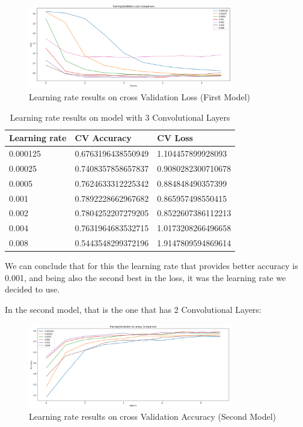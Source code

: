 \documentclass[conference]{IEEEtran}
\begin{document}
\begin{figure}[H]
    \centering
    \includegraphics[width=3.5in]{pictures/model1_learning_rate_loss.png}
    \caption{Learning rate results on cross Validation Loss (First Model)}\label{fig:example4}
\end{figure}

\begin{table}[H]
\centering
\caption{Learning rate results on model with 3 Convolutional Layers}
\begin{tabular}{ | m{3.5em} | m{3.2cm}| m{3.2cm} | }
\hline
Learning rate & CV Accuracy & CV Loss \\ 
\hline
0.000125 & 0.6763196438550949 & 1.104457899928093 \\
\hline
0.00025 & 0.7408357858657837 & 0.9080282300710678 \\
\hline
0.0005 & 0.7624633312225342 & 0.884848490357399 \\
\hline
0.001 & 0.7892228662967682 & 0.865957498550415 \\
\hline
0.002 & 0.7804252207279205 & 0.8522607386112213 \\
\hline
0.004 & 0.7631964683532715 & 1.0173208266496658 \\
\hline
0.008 & 0.5443548299372196 & 1.9147809594869614 \\
\hline
\end{tabular}
\end{table}

We can conclude that for this the learning rate that provides better accuracy is 0.001, and being also the second best in the loss, it was the learning rate we decided to use.

In the second model, that is the one that has 2 Convolutional Layers:
\begin{figure}[H]
    \centering
    \includegraphics[width=3.5in]{pictures/learning_rate_accuracy.png}
    \caption{Learning rate results on cross Validation Accuracy (Second Model)}\label{fig:example4}
\end{figure}
\end{document}
